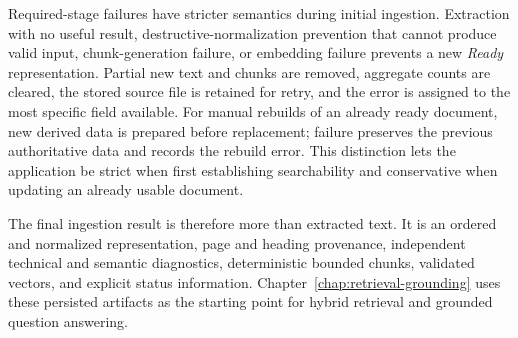 Required-stage failures have stricter semantics during initial ingestion.
Extraction with no useful result, destructive-normalization prevention that
cannot produce valid input, chunk-generation failure, or embedding failure
prevents a new \emph{Ready} representation. Partial new text and chunks are
removed, aggregate counts are cleared, the stored source file is retained for
retry, and the error is assigned to the most specific field available. For
manual rebuilds of an already ready document, new derived data is prepared
before replacement; failure preserves the previous authoritative data and
records the rebuild error. This distinction lets the application be strict
when first establishing searchability and conservative when updating an
already usable document.

The final ingestion result is therefore more than extracted text. It is an
ordered and normalized representation, page and heading provenance,
independent technical and semantic diagnostics, deterministic bounded chunks,
validated vectors, and explicit status information. Chapter~\ref{chap:retrieval-grounding} uses these
persisted artifacts as the starting point for hybrid retrieval and grounded
question answering.
